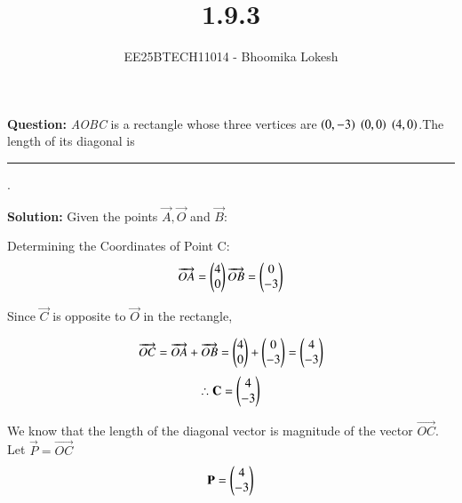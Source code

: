 \documentclass[journal]{IEEEtran}
\begin{document}

\vspace{3cm}

\title{1.9.3}
\author{EE25BTECH11014 - Bhoomika Lokesh}
{\let\newpage\relax\maketitle}

\renewcommand{\thefigure}{\theenumi}
\renewcommand{\thetable}{\theenumi}
\setlength{\intextsep}{10pt} %


\renewcommand{\thetable}{\theenumi}

\textbf{Question:}   \textit{AOBC} is a rectangle whose three vertices are $\left(0,-3\right)$ $\left(0,0\right)$ $\left(4,0\right)$.The length of its diagonal is\rule{2cm}{0.4pt}.

\textbf{Solution:}  Given the points $\vec{A},\vec{O}$ and $\vec{B}:$\\
\begin{table}[H]    
  \centering
  
  \caption{Vectors of the points.}
  \label{tab:1.9.3}
\end{table}



Determining the Coordinates of Point C:
\begin{align}
 \overrightarrow{OA} = \begin{pmatrix}4\\0 \end{pmatrix}
 \overrightarrow{OB} = \begin{pmatrix}0\\-3\end{pmatrix}
\end{align}

 Since $\vec{C}$ is opposite to $\vec{O}$ in the rectangle,
 
 \begin{align}
\overrightarrow{OC} = \overrightarrow{OA} + \overrightarrow{OB}=\begin{pmatrix}4\\0\end{pmatrix}+ \begin{pmatrix}0\\-3\end{pmatrix}=\begin{pmatrix}4\\-3\end{pmatrix}
 \end{align}
\begin{align}
\therefore \mathbf{C}=\begin{pmatrix}4\\-3\end{pmatrix}
\end{align}

We know that the length of the diagonal vector is magnitude of the vector $\overrightarrow{OC}$.\\
Let $\vec{P}=\overrightarrow{OC}$
\begin{align}
\mathbf{P}= \begin{pmatrix}4 \\ -3\end{pmatrix} 
\end{align}
\end{document}
